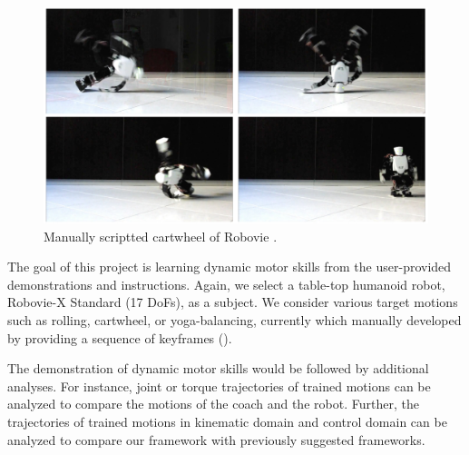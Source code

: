 \begin{figure}[htbp]
\center
  \includegraphics[width=5.0in]{images/training2_cartwheel}
  \caption{Manually scriptted cartwheel of Robovie \cite{Youtube-Robovie-X}.}
 \label{fig:cartwheel}
\end{figure}

The goal of this project is learning dynamic motor skills
from the user-provided demonstrations and instructions.
Again, we select a table-top humanoid robot, 
Robovie-X Standard (17 DoFs), as a subject.
We consider various target motions 
such as rolling, cartwheel, or yoga-balancing,
currently which manually developed by providing a sequence of keyframes 
().

The demonstration of dynamic motor skills would be followed by
additional analyses.
For instance, joint or torque trajectories of trained motions 
can be analyzed to compare the motions of the coach and the robot.
Further, the trajectories of trained motions in kinematic domain 
and control domain can be analyzed to compare our framework
with previously suggested frameworks.

